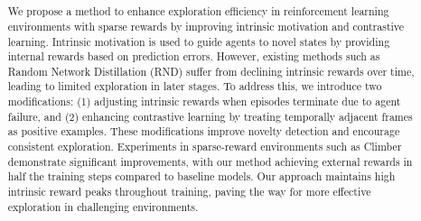 \usepackage{color}
\usepackage{amsmath}
\usepackage{graphicx}
\title{
}


\author{%
\and
{}
\and
{}
}



\begin{abstract}
We propose a method to enhance exploration efficiency in reinforcement learning environments with sparse rewards by improving intrinsic motivation and contrastive learning. Intrinsic motivation is used to guide agents to novel states by providing internal rewards based on prediction errors. However, existing methods such as Random Network Distillation (RND) suffer from declining intrinsic rewards over time, leading to limited exploration in later stages. To address this, we introduce two modifications: (1) adjusting intrinsic rewards when episodes terminate due to agent failure, and (2) enhancing contrastive learning by treating temporally adjacent frames as positive examples. These modifications improve novelty detection and encourage consistent exploration. Experiments in sparse-reward environments such as Climber demonstrate significant improvements, with our method achieving external rewards in half the training steps compared to baseline models. Our approach maintains high intrinsic reward peaks throughout training, paving the way for more effective exploration in challenging environments.
\end{abstract}

\def\Style{``jsaiac.sty''}
\def\BibTeX{{\rm B\kern-.05em{\sc i\kern-.025em b}\kern-.08em%
 T\kern-.1667em\lower.7ex\hbox{E}\kern-.125emX}}
\def\JBibTeX{\leavevmode\lower .6ex\hbox{J}\kern-0.15em\BibTeX}
\def\LaTeXe{\LaTeX\kern.15em2$_{\textstyle\varepsilon}$}


